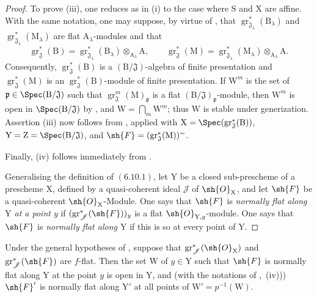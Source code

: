\begin{proof}
To prove (iii), one reduces as in (i) to the case where $\mathrm{S}$ and $\mathrm{X}$ are affine. With the same notation, one may suppose, by virtue of , that $\operatorname{gr}^*_{\mathfrak{J}_\lambda}(\mathrm{B}_\lambda)$ and $\operatorname{gr}^*_{\mathfrak{J}_\lambda}(\mathrm{M}_\lambda)$ are flat $\mathrm{A}_\lambda$-modules and that
\[
\operatorname{gr}^*_\mathfrak{J}(\mathrm{B})
=\operatorname{gr}^*_{\mathfrak{J}_\lambda}(\mathrm{B}_\lambda)\otimes_{\mathrm{A}_\lambda}\mathrm{A},
\qquad
\operatorname{gr}^*_\mathfrak{J}(\mathrm{M})
=\operatorname{gr}^*_{\mathfrak{J}_\lambda}(\mathrm{M}_\lambda)\otimes_{\mathrm{A}_\lambda}\mathrm{A}.
\]
Consequently, $\operatorname{gr}^*_\mathfrak{J}(\mathrm{B})$ is a $(\mathrm{B}/\mathfrak{J})$-algebra of finite presentation and $\operatorname{gr}^*_\mathfrak{J}(\mathrm{M})$ is an $\operatorname{gr}^*_\mathfrak{J}(\mathrm{B})$-module of finite presentation. If $\mathrm{W}^m$ is the set of $\mathfrak{p}\in\Spec(\mathrm{B}/\mathfrak{J})$ such that $\operatorname{gr}^m_\mathfrak{J}(\mathrm{M})_{\mathfrak{p}}$ is a flat $(\mathrm{B}/\mathfrak{J})_{\mathfrak{p}}$-module, then $\mathrm{W}^m$ is open in $\Spec(\mathrm{B}/\mathfrak{J})$ by , and $\mathrm{W}=\bigcap_m\mathrm{W}^m$; thus $\mathrm{W}$ is stable under generization. Assertion (iii) now follows from , applied with $\mathrm{X}=\Spec(\operatorname{gr}^*_\mathfrak{J}(\mathrm{B}))$, $\mathrm{Y}=\mathrm{Z}=\Spec(\mathrm{B}/\mathfrak{J})$, and $\sh{F}=(\operatorname{gr}^*_\mathfrak{J}(\mathrm{M}))^\sim$.

Finally, (iv) follows immediately from .

Generalising the definition of $(6.10.1)$, let $\mathrm{Y}$ be a closed sub-prescheme of a prescheme $\mathrm{X}$, defined by a quasi-coherent ideal $\mathscr{J}$ of $\sh{O}_\mathrm{X}$, and let $\sh{F}$ be a quasi-coherent $\sh{O}_\mathrm{X}$-Module. One says that $\sh{F}$ is \emph{normally flat along $\mathrm{Y}$ at a point $y$} if $(\operatorname{gr}^*_\mathscr{J}(\sh{F}))_y$ is a flat $\sh{O}_{\mathrm{Y},y}$-module. One says that $\sh{F}$ is \emph{normally flat along $\mathrm{Y}$} if this is so at every point of $\mathrm{Y}$.
\end{proof}

\begin{corollary}[11.3.5]
\label{IV.11.3.5}
Under the general hypotheses of , suppose that $\operatorname{gr}^*_\mathscr{J}(\sh{O}_\mathrm{X})$ and $\operatorname{gr}^*_\mathscr{J}(\sh{F})$ are $f$-flat. Then the set $\mathrm{W}$ of $y\in\mathrm{Y}$ such that $\sh{F}$ is normally flat along $\mathrm{Y}$ at the point $y$ is open in $\mathrm{Y}$, and (with the notations of ,~(iv))) $\sh{F}'$ is normally flat along $\mathrm{Y}'$ at all points of $\mathrm{W}'=p^{-1}(\mathrm{W})$.
\end{corollary}

